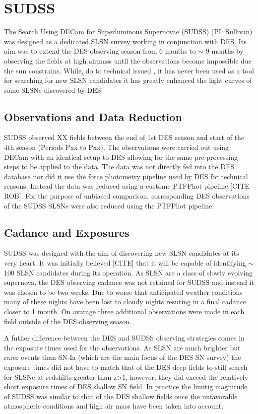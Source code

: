 \section{SUDSS}
The Search Using DECam for Superluminous Supernovae (SUDSS) (PI: Sullivan) was designed as a dedicated SLSN survey working in conjunction with DES. Its aim was to extend the DES observing season from 6 months to $\sim$ 9 months by observing the fields at high airmass until the observations become impossible due the sun constrains. While, do to technical issued , it has never been used as a tool for searching for new SLSN candidates it has greatly enhanced the light curves of some SLSNe discovered by DES.

\subsection{Observations and Data Reduction}
SUDSS observed XX fields between the end of 1st DES season and start of the 4th season (Periods Pxx to Pxx). The observations were carried out using DECam with an identical setup to DES allowing for the same pre-processing steps to be applied to the data. The data was not directly fed into the DES database nor did it use the force photometry pipeline used by DES for technical reasons. Instead the data was reduced using a custome PTFPhot pipeline [CITE ROB]. For the purpose of unbiased comparison, corresponding DES observations of the SUDSS SLSNe were also reduced using the PTFPhot pipeline.

\subsection{Cadance and Exposures}
\label{sec:SUDSSCadance}
SUDSS was designed with the aim of discovering new SLSN candidates at its very heart. It was initially believed [CITE] that it will be capable of identifying $\sim$ 100 SLSN candidates during its operation. As SLSN are a class of slowly evolving supernova, the DES observing cadance was not retained for SUDSS and instead it was chosen to be two weeks. Due to worse that anticipated weather conditions many of these nights have been lost to cloudy nights resuting in a final cadance closer to 1 month. On avarage three additional observations were made in each field outside of the DES observing season.

A futher difference between the DES and SUDSS observing strategies comes in the exposure times used for the observations. As SLSN are much brighter but rarer events than SN-Ia (which are the main focus of the DES SN survey) the exposure times did not have to match that of the DES deep fields to still search for SLSNe at redshifts greater than z>1, however, they did exceed the relatively short exposure times of DES shallow SN field. In practice the limitig magnitude of SUDSS was similar to that of the DES shallow fields once the unfavorable atmospheric conditions and high air mass have been taken into account.

